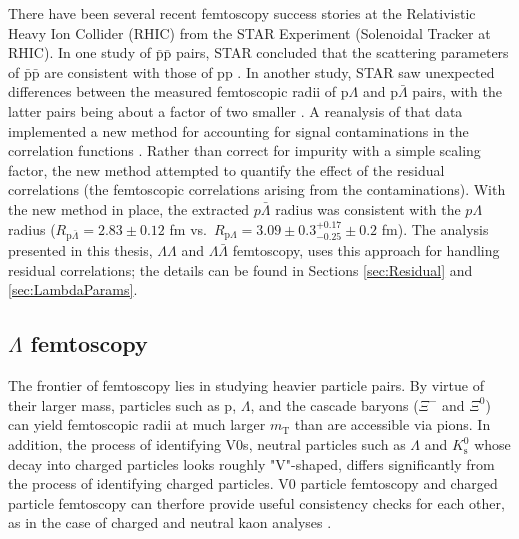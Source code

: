 There have been several recent femtoscopy success stories at the Relativistic Heavy Ion Collider (RHIC) from the STAR Experiment (Solenoidal Tracker at RHIC).
In one study of $\bar{\mathrm{p}}\bar{\mathrm{p}}$ pairs, STAR concluded that the scattering parameters of $\bar{\mathrm{p}}\bar{\mathrm{p}}$ are consistent with those of pp \cite{Adamczyk:2015hza}.
In another study, STAR saw unexpected differences between the measured femtoscopic radii of p$\Lambda$ and p$\bar{\Lambda}$ pairs, with the latter pairs being about a factor of two smaller \cite{Adams:2005ws}.
A reanalysis of that data implemented a new method for accounting for signal contaminations in the correlation functions \cite{Kisiel:2014mma}.
Rather than correct for impurity with a simple scaling factor, the new method attempted to quantify the effect of the residual correlations (the femtoscopic correlations arising from the contaminations).
With the new method in place, the extracted $p\bar{\Lambda}$ radius was consistent with the $p\Lambda$ radius ($R_{\mathrm{p}\bar{\Lambda}} = 2.83 \pm 0.12$ fm vs.\ $R_{\mathrm{p}\Lambda} = 3.09 \pm 0.3^{+0.17}_{-0.25} \pm 0.2$ fm).
The analysis presented in this thesis, $\Lambda\Lambda$ and $\Lambda\bar{\Lambda}$ femtoscopy, uses this approach for handling residual correlations; the details can be found in Sections \ref{sec:Residual} and \ref{sec:LambdaParams}.


\subsection{$\Lambda$ femtoscopy}
\label{sec:LambdaFemto}

The frontier of femtoscopy lies in studying heavier particle pairs.
By virtue of their larger mass, particles such as p, $\Lambda$, and the cascade baryons ($\Xi^-$ and $\Xi^0$) can yield femtoscopic radii at much larger $m_\mathrm{T}$ than are accessible via pions.
In addition, the process of identifying V0s, neutral particles such as $\Lambda$ and $K^0_\mathrm{s}$ whose decay into charged particles looks roughly "V"-shaped, differs significantly from the process of identifying charged particles.
V0 particle femtoscopy and charged particle femtoscopy can therfore provide useful consistency checks for each other, as in the case of charged and neutral kaon analyses \cite{Adam:2015vja}.

